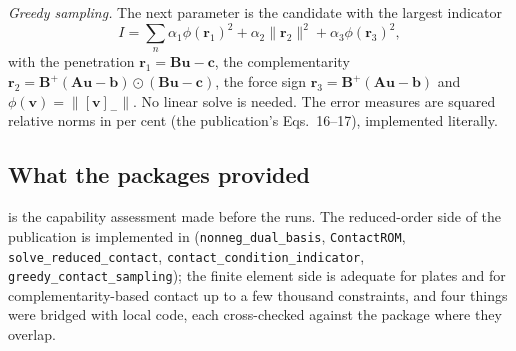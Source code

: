 \emph{Greedy sampling.} The next parameter is the candidate with the largest indicator
\begin{equation}\label{eq:bl-ind}
I=\sum_n\alpha_1\phi(\mathbf r_1)^2+\alpha_2\lVert\mathbf r_2\rVert^2+\alpha_3\phi(\mathbf r_3)^2,
\end{equation}
with the penetration $\mathbf r_1=\mathbf B\mathbf u-\mathbf c$, the complementarity $\mathbf r_2=\mathbf B^{+}(\mathbf A\mathbf u-\mathbf b)\odot(\mathbf B\mathbf u-\mathbf c)$, the force sign $\mathbf r_3=\mathbf B^{+}(\mathbf A\mathbf u-\mathbf b)$ and $\phi(\mathbf v)=\lVert[\mathbf v]_-\rVert$. No linear solve is needed. The error measures are squared relative norms in per cent (the publication's Eqs.~16--17), implemented literally.

\subsection*{What the packages provided}

 is the capability assessment made before the runs. The reduced-order side of the publication is implemented in \rom{} (\texttt{nonneg\_dual\_basis}, \texttt{ContactROM}, \texttt{solve\_reduced\_contact}, \texttt{contact\_condition\_indicator}, \texttt{greedy\_contact\_sampling}); the finite element side is adequate for plates and for complementarity-based contact up to a few thousand constraints, and four things were bridged with local code, each cross-checked against the package where they overlap.

